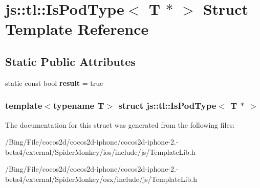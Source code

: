 \hypertarget{structjs_1_1tl_1_1_is_pod_type_3_01_t_01_5_01_4}{\section{js\-:\-:tl\-:\-:Is\-Pod\-Type$<$ T $\ast$ $>$ Struct Template Reference}
\label{structjs_1_1tl_1_1_is_pod_type_3_01_t_01_5_01_4}
}
\subsection*{Static Public Attributes}
\begin{DoxyCompactItemize}
\item 
\hypertarget{structjs_1_1tl_1_1_is_pod_type_3_01_t_01_5_01_4_ade6c0baf6bcfc641efd938238fba10a8}{static const bool {\bfseries result} = true}\label{structjs_1_1tl_1_1_is_pod_type_3_01_t_01_5_01_4_ade6c0baf6bcfc641efd938238fba10a8}

\end{DoxyCompactItemize}
\subsubsection*{template$<$typename T$>$ struct js\-::tl\-::\-Is\-Pod\-Type$<$ T $\ast$ $>$}



The documentation for this struct was generated from the following files\-:\begin{DoxyCompactItemize}
\item 
/\-Bing/\-File/cocos2d/cocos2d-\/iphone/cocos2d-\/iphone-\/2.-\/beta4/external/\-Spider\-Monkey/ios/include/js/Template\-Lib.\-h\item 
/\-Bing/\-File/cocos2d/cocos2d-\/iphone/cocos2d-\/iphone-\/2.-\/beta4/external/\-Spider\-Monkey/osx/include/js/Template\-Lib.\-h\end{DoxyCompactItemize}
